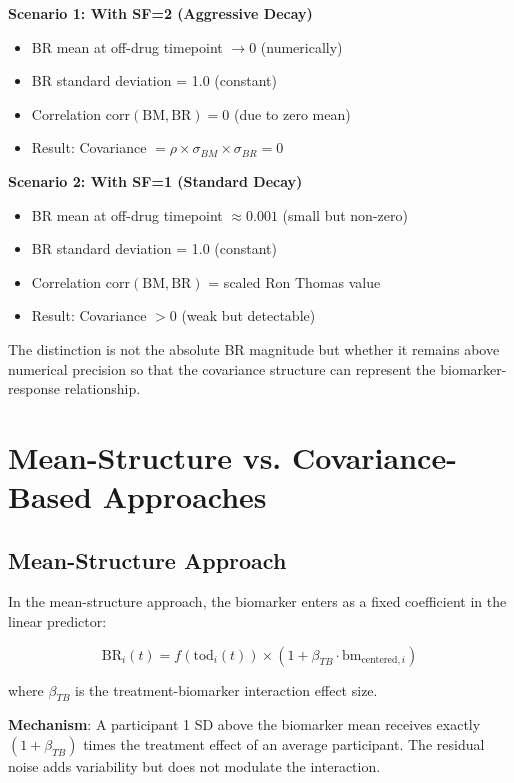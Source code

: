 \documentclass[12pt,a4paper]{article}
\begin{document}
\textbf{Scenario 1: With SF=2 (Aggressive Decay)}
\begin{itemize}
\item BR mean at off-drug timepoint $\to 0$ (numerically)
\item BR standard deviation = 1.0 (constant)
\item Correlation $\text{corr}(\text{BM}, \text{BR}) = 0$ (due to zero mean)
\item Result: Covariance $= \rho \times \sigma_{BM} \times \sigma_{BR} = 0$
\end{itemize}

\textbf{Scenario 2: With SF=1 (Standard Decay)}
\begin{itemize}
\item BR mean at off-drug timepoint $\approx 0.001$ (small but non-zero)
\item BR standard deviation = 1.0 (constant)
\item Correlation $\text{corr}(\text{BM}, \text{BR})$ = scaled Ron Thomas value
\item Result: Covariance $> 0$ (weak but detectable)
\end{itemize}

The distinction is not the absolute BR magnitude but whether it remains above numerical precision so that the covariance structure can represent the biomarker-response relationship.

\section{Mean-Structure vs. Covariance-Based Approaches}

\subsection{Mean-Structure Approach}

In the mean-structure approach, the biomarker enters as a fixed coefficient in the linear predictor:

\begin{equation}
\text{BR}_i(t) = f(\text{tod}_i(t)) \times (1 + \beta_{TB} \cdot \text{bm}_{\text{centered}, i})
\end{equation}

where $\beta_{TB}$ is the treatment-biomarker interaction effect size.

\textbf{Mechanism}: A participant 1 SD above the biomarker mean receives exactly $(1 + \beta_{TB})$ times the treatment effect of an average participant. The residual noise adds variability but does not modulate the interaction.
\end{document}
